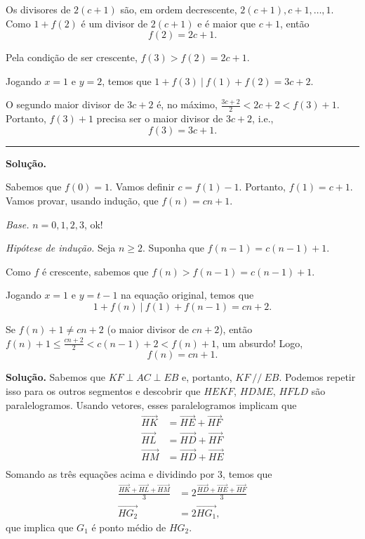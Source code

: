 \documentclass[10pt, a4paper]{article}
\newcommand\seprule{
	
	\vspace{-1.5em}
	\begin{center}
		\rule{.97\textwidth}{.5pt}
	\end{center}
	\vspace{-.5em}

}
\begin{document}
	Os divisores de $2(c+1)$ são, em ordem decrescente, $2(c+1), c+1, \dots, 1$. Como $1 + f(2)$ é um divisor de $2(c+1)$ e é maior que $c+1$, então \[f(2) = 2c + 1.\]

	Pela condição de ser crescente, $f(3) > f(2) = 2c + 1$.

	Jogando $x = 1$ e $y=2$, temos que $1 + f(3)~|~f(1)+f(2) = 3c + 2$.

	O segundo maior divisor de $3c+2$ é, no máximo, $\frac{3c+2}{2} < 2c+2 < f(3) + 1$. Portanto, $f(3) + 1$ precisa ser o maior divisor de $3c+2$, i.e., \[f(3) = 3c + 1.\]

	\seprule

	\noindent \textbf{Solução.}

	Sabemos que $f(0) = 1$. Vamos definir $c = f(1) - 1$. Portanto, $f(1) = c + 1$. Vamos provar, usando indução, que $f(n) = cn + 1$.

	\textit{Base.} $n = 0, 1, 2, 3$, ok!

	\textit{Hipótese de indução.} Seja $n \ge 2$. Suponha que $f(n-1) = c(n-1) + 1$.

	Como $f$ é crescente, sabemos que $f(n) > f(n-1) = c(n-1) + 1$.

	Jogando $x = 1$ e $y = t-1$ na equação original, temos que \[1 + f(n)~|~f(1) + f(n-1) = cn + 2.\]

	Se $f(n) + 1 \neq cn + 2$ (o maior divisor de $cn + 2$), então $f(n) + 1 \le \frac{cn+2}{2} < c(n-1) + 2 < f(n) + 1$, um absurdo! Logo, \[f(n) = cn + 1.\]

	\newpage

	\noindent \textbf{Solução.}
	Sabemos que $KF \perp AC \perp EB$ e, portanto, $KF~//~EB$. Podemos repetir isso para os outros segmentos e descobrir que $HEKF$, $HDME$, $HFLD$ são paralelogramos. Usando vetores, esses paralelogramos implicam que 
	\begin{align*}
		\vec{HK} & = \vec{HE} + \vec{HF} \\
		\vec{HL} & = \vec{HD} + \vec{HF} \\
		\vec{HM} & = \vec{HD} + \vec{HE} \\
	\end{align*}
	Somando as três equações acima e dividindo por 3, temos que
	\begin{align*}
		\frac{\vec{HK} + \vec{HL} + \vec{HM}}{3} & = 2 \frac{\vec{HD} + \vec{HE} + \vec{HF}}{3}\\
		\vec{HG_2} & = 2 \vec{HG_1},
	\end{align*}
	que implica que $G_1$ é ponto médio de $HG_2$.
	
\end{document}
